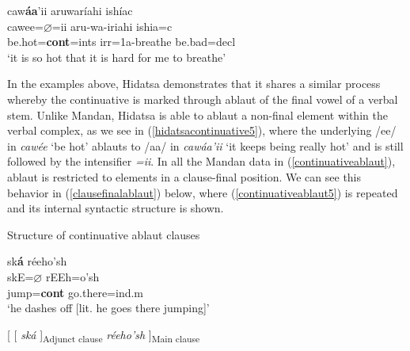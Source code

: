 \begin{exe}
\begin{xlist}
	\item\label{hidatsacontinuative5}
	
	\glll caw\textbf{áa}'ii aruwaríahi ishíac\\
	cawee=$\varnothing$=ii aru-wa-iriahi ishia=c\\
	\textnormal{be.hot}=\textbf{cont}=ints irr=1a-\textnormal{breathe} \textnormal{be.bad}=decl\\
	\glt `it is so hot that it is hard for me to breathe' \citep[230]{park2012}
	
	\end{xlist}

\end{exe}

In the examples above, Hidatsa demonstrates that it shares a similar process whereby the continuative is marked through ablaut of the final vowel of a verbal stem. Unlike Mandan, Hidatsa is able to ablaut a non-final element within the verbal complex, as we see in (\ref{hidatsacontinuative5}), where the underlying /ee/ in \textit{cawée} `be hot' ablauts to /aa/ in \textit{cawáa'ii} `it keeps being really hot' and is still followed by the intensifier \textit{=ii}. In all the Mandan data in (\ref{continuativeablaut}), ablaut is restricted to elements in a clause-final position. We can see this behavior in (\ref{clausefinalablaut}) below, where (\ref{continuativeablaut5}) is repeated and its internal syntactic structure is shown.

\begin{exe}

\item\label{clausefinalablaut} Structure of continuative ablaut clauses

	\begin{xlist}
	
	\item\label{clausefinalablaut1}
	
	\glll sk\textbf{á} réeho'sh\\
	skE=$\varnothing$ rEEh=o'sh\\
	\textnormal{jump}=\textbf{cont} \textnormal{go.there}=ind.m\\
	\glt `he dashes off [lit. he goes there jumping]' \citep[211]{hollow1970}

	\item\label{clausefinalablaut2}
	
	{[} {[} \textit{ská} {]}\textsubscript{Adjunct clause} \textit{réeho'sh} {]}\textsubscript{Main clause} 

	\end{xlist}

\end{exe}

